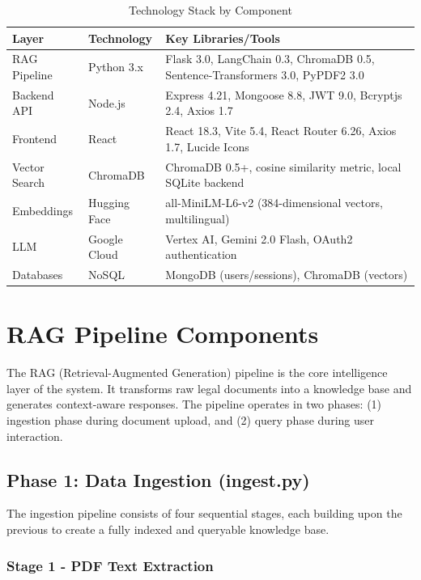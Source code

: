 \documentclass[12pt,a4paper]{article}
\begin{document}
\begin{table}[H]
\centering
\caption{Technology Stack by Component}
\label{tab:tech_stack}
\begin{tabular}{|l|l|p{3cm}|}
\hline
\textbf{Layer} & \textbf{Technology} & \textbf{Key Libraries/Tools} \\
\hline
RAG Pipeline & Python 3.x & Flask 3.0, LangChain 0.3, ChromaDB 0.5, Sentence-Transformers 3.0, PyPDF2 3.0 \\
\hline
Backend API & Node.js & Express 4.21, Mongoose 8.8, JWT 9.0, Bcryptjs 2.4, Axios 1.7 \\
\hline
Frontend & React & React 18.3, Vite 5.4, React Router 6.26, Axios 1.7, Lucide Icons \\
\hline
Vector Search & ChromaDB & ChromaDB 0.5+, cosine similarity metric, local SQLite backend \\
\hline
Embeddings & Hugging Face & all-MiniLM-L6-v2 (384-dimensional vectors, multilingual) \\
\hline
LLM & Google Cloud & Vertex AI, Gemini 2.0 Flash, OAuth2 authentication \\
\hline
Databases & NoSQL & MongoDB (users/sessions), ChromaDB (vectors) \\
\hline
\end{tabular}
\end{table}

\section{RAG Pipeline Components}

The RAG (Retrieval-Augmented Generation) pipeline is the core intelligence layer of the system. It transforms raw legal documents into a knowledge base and generates context-aware responses. The pipeline operates in two phases: (1) ingestion phase during document upload, and (2) query phase during user interaction.

\subsection{Phase 1: Data Ingestion (ingest.py)}

The ingestion pipeline consists of four sequential stages, each building upon the previous to create a fully indexed and queryable knowledge base.

\subsubsection{Stage 1 - PDF Text Extraction}
\end{document}
